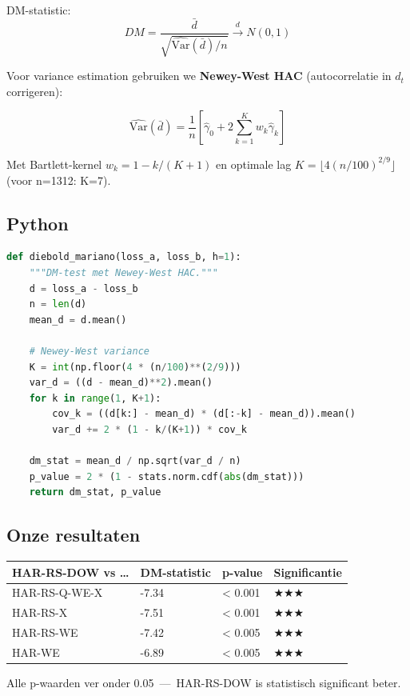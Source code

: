 DM-statistic:
\[DM = \frac{\bar d}{\sqrt{\widehat{\text{Var}}(\bar d)/n}} \xrightarrow{d} N(0, 1)\]

Voor variance estimation gebruiken we \textbf{Newey-West HAC} (autocorrelatie in \(d_t\) corrigeren):

\[\widehat{\text{Var}}(\bar d) = \frac{1}{n}\left[\hat\gamma_0 + 2\sum_{k=1}^{K} w_k \hat\gamma_k\right]\]

Met Bartlett-kernel \(w_k = 1 - k/(K+1)\) en optimale lag \(K = \lfloor 4(n/100)^{2/9} \rfloor\) (voor n=1312: K=7).

\hypertarget{python}{%
\subsection{Python}\label{python}}

\begin{lstlisting}[language=Python]
def diebold_mariano(loss_a, loss_b, h=1):
    """DM-test met Newey-West HAC."""
    d = loss_a - loss_b
    n = len(d)
    mean_d = d.mean()
    
    # Newey-West variance
    K = int(np.floor(4 * (n/100)**(2/9)))
    var_d = ((d - mean_d)**2).mean()
    for k in range(1, K+1):
        cov_k = ((d[k:] - mean_d) * (d[:-k] - mean_d)).mean()
        var_d += 2 * (1 - k/(K+1)) * cov_k
    
    dm_stat = mean_d / np.sqrt(var_d / n)
    p_value = 2 * (1 - stats.norm.cdf(abs(dm_stat)))
    return dm_stat, p_value
\end{lstlisting}

\hypertarget{onze-resultaten}{%
\subsection{Onze resultaten}\label{onze-resultaten}}

\begin{longtable}[]{@{}llll@{}}
\toprule
HAR-RS-DOW vs \ldots{} & DM-statistic & p-value & Significantie \\
\midrule
\endhead
HAR-RS-Q-WE-X & -7.34 & \textless{} 0.001 & ★★★ \\
HAR-RS-X & -7.51 & \textless{} 0.001 & ★★★ \\
HAR-RS-WE & -7.42 & \textless{} 0.005 & ★★★ \\
HAR-WE & -6.89 & \textless{} 0.005 & ★★★ \\
\bottomrule
\end{longtable}

Alle p-waarden ver onder 0.05 \,---\, HAR-RS-DOW is statistisch significant beter.

